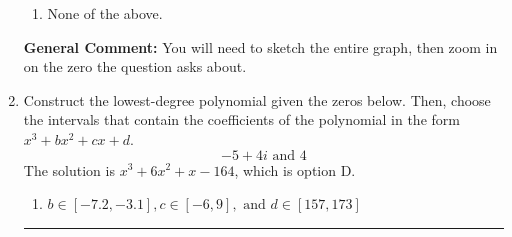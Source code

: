\documentclass{extbook}[14pt]
\newcommand{\litem}[1]{\item #1

\rule{\textwidth}{0.4pt}}
\begin{document}
\begin{enumerate}
{\begin{enumerate}[label=\Alph*.]
\item None of the above.\end{enumerate}
\textbf{General Comment:} You will need to sketch the entire graph, then zoom in on the zero the question asks about.
}
\litem{
Construct the lowest-degree polynomial given the zeros below. Then, choose the intervals that contain the coefficients of the polynomial in the form $x^3+bx^2+cx+d$.
\[ -5 + 4 i \text{ and } 4 \]The solution is \( x^{3} +6 x^{2} +x -164 \), which is option D.\begin{enumerate}[label=\Alph*.]
\item \( b \in [-7.2, -3.1], c \in [-6, 9], \text{ and } d \in [157, 173] \)


\end{enumerate}}
\end{enumerate}
\end{document}
